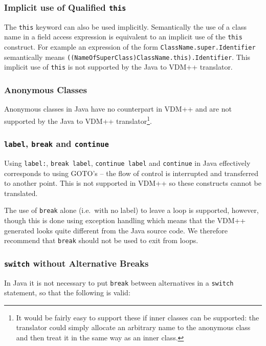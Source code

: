 \documentclass[\pformat,12pt]{article}
\begin{document}
\subsubsection{Implicit use of Qualified \texttt{this}}

The \texttt{this} keyword can also be used implicitly. Semantically
the use of a class name in a field access expression is equivalent to
an implicit use of the \texttt{this} construct. For example an
expression of the form \texttt{ClassName.super.Identifier}
semantically means \texttt{((NameOfSuperClass)ClassName.this).Identifier}. This
implicit use of \texttt{this} is not supported by the
Java to VDM++ translator.

\subsubsection{Anonymous Classes}

Anonymous classes in Java have no counterpart in VDM++ and are not
supported by the Java to VDM++ translator\footnote{It would be fairly
  easy to support these if inner classes can be supported: the translator
  could simply allocate an arbitrary name to the anonymous class and
  then treat it in the same way as an inner class.}. 

\subsubsection{\texttt{label}, \texttt{break} and \texttt{continue}}

Using \texttt{label:}, \texttt{break label}, \texttt{continue
  label} and \texttt{continue} in Java effectively corresponds to
  using GOTO's -- the flow of control is interrupted and transferred
  to another point. This is not supported in VDM++ so these constructs
  cannot be translated.

The use of \texttt{break} alone (i.e.\ with no label) to leave a loop
is supported, however, though this is done using exception handling
which means that the VDM++ generated looks quite different from the
Java source code. We therefore recommend that \texttt{break} should
not be used to exit from loops.

\subsubsection{\texttt{switch} without Alternative Breaks}

In Java it is not necessary to put \texttt{break} between alternatives
in a \texttt{switch} statement, so that the following is valid:
\end{document}
